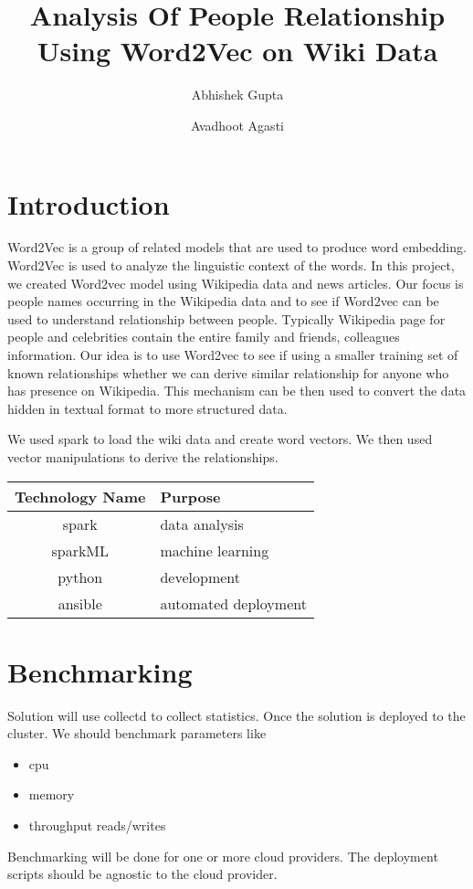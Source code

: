 \documentclass[9pt,twocolumn,twoside]{../../styles/osajnl}
\title{Analysis Of People Relationship Using Word2Vec on Wiki Data}
\author[1,*]{Abhishek Gupta}
\author[1, **]{Avadhoot Agasti}
\affil[1]{School of Informatics and Computing, Bloomington, IN 47408, U.S.A.}
\affil[*]{Corresponding authors: abhigupt@iu.edu}
\affil[**]{Corresponding authors: aagasti@iu.edu}
\begin{document}
\maketitle

\tableofcontents

\section{Introduction}

Word2Vec \cite{www-word2vec} is a group of related models that are used to
produce word embedding. Word2Vec is used to analyze the linguistic context
of the words. In this project, we created Word2vec model using Wikipedia data
and news articles.  Our focus is people names occurring in the
Wikipedia data and to see if Word2vec can be used to understand relationship
 between people. Typically Wikipedia page for people and celebrities contain
  the entire family and friends, colleagues information. Our idea is to use
  Word2vec to see if using a smaller training set of known relationships
  whether we can derive similar relationship for anyone who has presence on
  Wikipedia. This mechanism can be then used to convert the data hidden in
  textual format to more structured data.

We used spark \cite{www-spark-python} to load the wiki data and create word
vectors. We then used vector manipulations to derive the relationships.


\begin{center}
 \begin{tabular}{||c l||} 
 \hline
 Technology Name & Purpose  \\ [0.5ex] 
 \hline\hline
 spark \cite{www-spark-python} & data analysis  \\
 \hline
 sparkML \cite{www-sparkml} & machine learning  \\
 \hline
 python \cite{www-spark-python} & development \\
 \hline
 ansible \cite{www-ansible} & automated deployment \\
 \hline
\end{tabular}
\end{center}





\section{Benchmarking}
Solution will use collectd \cite{www-collectd} to collect statistics. Once the solution is deployed to the cluster. We should benchmark parameters like
\begin{itemize}[noitemsep]
\item cpu
\item memory
\item throughput reads/writes
\end{itemize}
Benchmarking will be done for one or more cloud providers. The deployment scripts should be agnostic to the cloud provider. 
\end{document}
